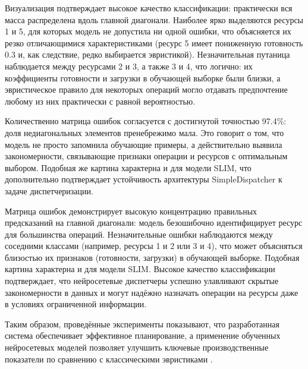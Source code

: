 Визуализация подтверждает высокое качество классификации: практически вся масса распределена вдоль главной диагонали. Наиболее ярко выделяются ресурсы 1 и 5, для которых модель не допустила ни одной ошибки, что объясняется их резко отличающимися характеристиками (ресурс 5 имеет пониженную готовность 0.3 и, как следствие, редко выбирается эвристикой). Незначительная путаница наблюдается между ресурсами 2 и 3, а также 3 и 4, что логично: их коэффициенты готовности и загрузки в обучающей выборке были близки, а эвристическое правило для некоторых операций могло отдавать предпочтение любому из них практически с равной вероятностью.

Количественно матрица ошибок согласуется с достигнутой точностью 97.4\%: доля недиагональных элементов пренебрежимо мала. Это говорит о том, что модель не просто запомнила обучающие примеры, а действительно выявила закономерности, связывающие признаки операции и ресурсов с оптимальным выбором. Подобная же картина характерна и для модели SLIM, что дополнительно подтверждает устойчивость архитектуры SimpleDispatcher к задаче диспетчеризации.

Матрица ошибок демонстрирует высокую концентрацию правильных предсказаний на главной диагонали: модель безошибочно идентифицирует ресурс для большинства операций. Незначительные ошибки наблюдаются между соседними классами (например, ресурсы 1 и 2 или 3 и 4), что может объясняться близостью их признаков (готовности, загрузки) в обучающей выборке. Подобная картина характерна и для модели SLIM. Высокое качество классификации подтверждает, что нейросетевые диспетчеры успешно улавливают скрытые закономерности в данных и могут надёжно назначать операции на ресурсы даже в условиях ограниченной информации.

Таким образом, проведённые эксперименты показывают, что разработанная система обеспечивает эффективное планирование, а применение обученных нейросетевых моделей позволяет улучшить ключевые производственные показатели по сравнению с классическими эвристиками \cite{ISOP}.